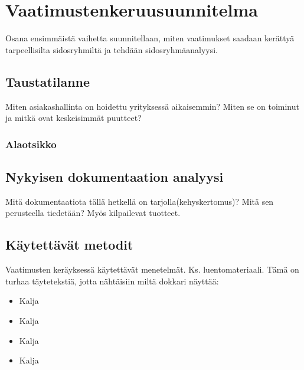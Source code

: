 \chapter{Vaatimustenkeruusuunnitelma} %
\label{keruu} %
\thispagestyle{fancy} %

Osana ensimmäistä vaihetta suunnitellaan, miten vaatimukset saadaan kerättyä tarpeellisilta sidosryhmiltä ja tehdään sidosryhmäanalyysi. 

\section{Taustatilanne}  %

    Miten asiakashallinta on hoidettu yrityksessä aikaisemmin? Miten se on toiminut ja mitkä ovat keskeisimmät puutteet?

    \lipsum

\subsection{Alaotsikko}

    \lipsum[2]


\section{Nykyisen dokumentaation analyysi}

    Mitä dokumentaatiota tällä hetkellä on tarjolla(kehyskertomus)? Mitä sen perusteella tiedetään? Myös kilpailevat tuotteet.

    \lipsum[1]

\section{Käytettävät metodit}

Vaatimusten keräyksessä käytettävät menetelmät. Ks. luentomateriaali. Tämä on turhaa täytetekstiä, jotta nähtäisiin miltä dokkari näyttää:

    \begin{itemize}
        \item Kalja
        \item Kalja
        \item Kalja
        \item Kalja    
    \end{itemize}

